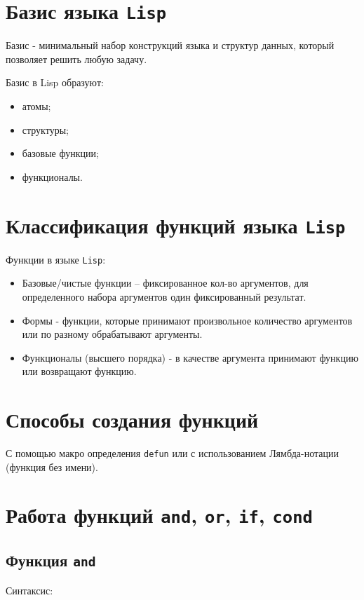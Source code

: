 \section*{Базис языка \texttt{Lisp}}
Базис - минимальный набор конструкций языка и структур данных, который позволяет решить любую задачу.

Базис в Lisp образуют:
\begin{itemize}
	\item атомы;
	\item структуры;
	\item базовые функции;
	\item функционалы.
\end{itemize}

\section*{Классификация функций языка {\texttt{Lisp}}}

Функции в языке {\texttt{Lisp}}:
\begin{itemize}
	\item Базовые/чистые функции -- фиксированное кол-во аргументов, для определенного набора аргументов один фиксированный результат.
	\item Формы - функции, которые принимают произвольное количество аргументов или по разному обрабатывают аргументы.
	\item Функционалы (высшего порядка) - в качестве аргумента принимают функцию или возвращают функцию.
\end{itemize}

\section*{Способы создания функций}

С помощью макро определения \texttt{defun} или с использованием Лямбда-нотации (функция без имени).

\section*{Работа функций \texttt{and}, \texttt{or}, \texttt{if}, \texttt{cond}}

\subsection*{Функция \texttt{and}}

Синтаксис: 

